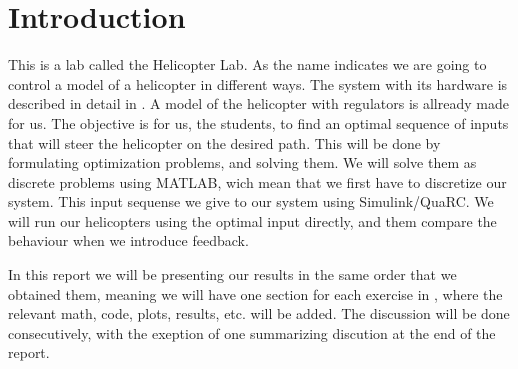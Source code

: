 \section{Introduction}

This is a lab called the Helicopter Lab. As the name indicates we are going to control a model of a helicopter in different ways. The system with its hardware is described in detail in \cite{_helicopter_2015}. A model of the helicopter with regulators is allready made for us. The objective is for us, the students, to find an optimal sequence of inputs that will steer the helicopter on the desired path. This will be done by formulating optimization problems, and solving them. We will solve them as discrete problems using MATLAB, wich mean that we first have to discretize our system. This input sequense we give to our system using Simulink/QuaRC. We will run our helicopters using the optimal input directly, and them compare the behaviour when we introduce feedback.

In this report we will be presenting our results in the same order that we obtained them, meaning we will have one section for each exercise in \cite{_helicopter_2015}, where the relevant math, code, plots, results, etc. will be added. The discussion will be done consecutively, with the exeption of one summarizing discution at the end of the report. 